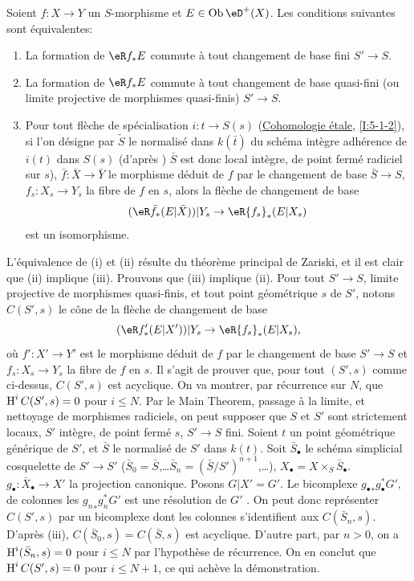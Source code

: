 \begin{proposition}\label{VII:5-1-1}
Soient $f:X\to Y$ un $S$-morphisme et $E\in\ob \eD^+(X)$. Les conditions 
suivantes sont équivalentes: 
\begin{enumerate}[\indent (i)]
  \item La formation de $\eR f_\ast E$ commute à tout changement de base 
    fini $S'\to S$.
  \item La formation de $\eR f_\ast E$ commute à tout changement de base 
    quasi-fini (ou limite projective de morphismes quasi-finis) $S'\to S$. 
  \item Pour tout flèche de spécialisation $i:t\to S(s)$ 
    (\hyperref[I]{Cohomologie étale}, \ref{I:5-1-2}), si l'on désigne par 
    $\widetilde S$ le normalisé dans $k(\bar t)$ du schéma intègre 
    adhérence de $i(t)$ dans $S(s)$ (d'après 
    \cite[IV, 6.15.5, 18.6.11, 18.8.16]{ega}) $\bar S$ est donc local 
    intègre, de point fermé radiciel sur $s$), $\bar f:\bar X\to \bar Y$ 
    le morphisme déduit de $f$ par le changement de base $\bar S\to S$, 
    $f_s:X_s\to Y_s$ la fibre de $f$ en $s$, alors la flèche de changement 
    de base 
    \[
      (\eR \bar f_\ast (E|\bar X))|Y_s \to \eR {f_s}_\ast(E|X_s) 
    \]
    est un isomorphisme. 
\end{enumerate}
\end{proposition}

L'équivalence de (i) et (ii) résulte du théorème principal de Zariski, 
et il est clair que (ii) implique (iii). Prouvons que (iii) implique (ii). Pour 
tout $S'\to S$, limite projective de morphismes quasi-finis, et tout point 
géométrique $s$ de $S'$, notons $C(S',s)$ le cône de la flèche de 
changement de base 
\[
  (\eR f_\ast'(E|X'))|Y_s \to \eR{f_s}_\ast (E|X_s) \text{,} 
\]
où $f':X'\to Y'$ est le morphisme déduit de $f$ par le changement de base 
$S'\to S$ et $f_s:X_s\to Y_s$ la fibre de $f$ en $s$. Il s'agit de prouver que, 
pour tout $(S',s)$ comme ci-dessus, $C(S',s)$ est acyclique. On va montrer, par 
récurrence sur $N$, que $\operatorname{H}^i C(S',s) = 0$ pour $i\leqslant N$. Par le Main 
Theorem, passage à la limite, et nettoyage de morphismes radiciels, on peut 
supposer que $S$ et $S'$ sont strictement locaux, $S'$ intègre, de point 
fermé $s$, $S'\to S$ fini. Soient $t$ un point géométrique générique 
de $S'$, et $\bar S$ le normalisé de $S'$ dans $k(t)$. Soit $\bar S_\bullet$ 
le schéma simplicial cosquelette de $S'\to S'$ 
($\bar S_0=\bar S$,\ldots $\bar S_n=(\bar S/S')^{n+1}$,\ldots), 
$X_\bullet=X\times_S \bar S_\bullet$. $g_\bullet:\bar X_\bullet \to X'$ la 
projection canonique. Posons $G|X'=G'$. Le bicomplexe 
${g_\bullet}_\ast g_\bullet^\ast G'$, de colonnes les 
${g_n}_\ast g_n^\ast G'$ est une résolution de $G'$ \cite[VIII 8]{sga4}. On 
peut donc représenter $C(S',s)$ par un bicomplexe dont les colonnes 
s'identifient aux $C(\bar S_n,s)$. D'après (iii), $C(\bar S_0,s)=C(\bar S,s)$ 
est acyclique. D'autre part, par $n>0$, on a $\operatorname{H}^i(\bar S_n,s)=0$ pour 
$i\leqslant N$ par l'hypothèse de récurrence. On en conclut que 
$\operatorname{H}^i C(S',s)=0$ pour $i\leqslant N+1$, ce qui achève la démonstration. 





